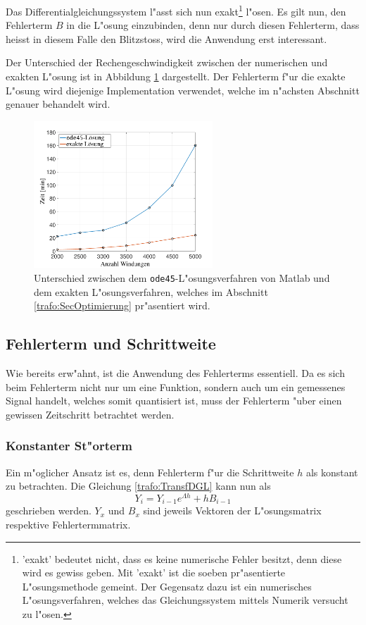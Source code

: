 \begin{refsection}
Das Differentialgleichungssystem l"asst sich nun exakt\footnote{'exakt' bedeutet nicht, dass es keine numerische Fehler besitzt, denn diese wird es gewiss geben. Mit 'exakt' ist die soeben pr"asentierte L"osungsmethode gemeint. Der Gegensatz dazu ist ein numerisches L"osungsverfahren, welches das Gleichungssystem mittels Numerik versucht zu l"osen.} l"osen. Es gilt nun, den Fehlerterm $B$ in die L"osung einzubinden, denn nur durch diesen Fehlerterm, dass heisst in diesem Falle den Blitzstoss, wird die Anwendung erst interessant.

Der Unterschied der Rechengeschwindigkeit zwischen der numerischen und exakten L"osung ist in Abbildung \ref{trafo:ode45vsExact} dargestellt. Der Fehlerterm f"ur die exakte L"osung wird diejenige Implementation verwendet, welche im n"achsten Abschnitt genauer behandelt wird. 

	\begin{figure}
		\centering
		\includegraphics[width=0.6\textwidth]{./Trafo/images/ode45vsExact.pdf}
		\caption{Unterschied zwischen dem \texttt{ode45}-L"osungsverfahren von Matlab und dem exakten L"osungsverfahren, welches im Abschnitt \ref{trafo:SecOptimierung} pr"asentiert wird.}
		\label{trafo:ode45vsExact}
	\end{figure}


\subsection{Fehlerterm und Schrittweite}
Wie bereits erw"ahnt, ist die Anwendung des Fehlerterms essentiell. Da es sich beim Fehlerterm nicht nur um eine Funktion, sondern auch um ein gemessenes Signal handelt, welches somit quantisiert ist, muss der Fehlerterm "uber einen gewissen Zeitschritt betrachtet werden.

\subsubsection{Konstanter St"orterm}
Ein m"oglicher Ansatz ist es, denn Fehlerterm f"ur die Schrittweite $h$ als konstant zu betrachten. Die Gleichung \ref{trafo:TransfDGL} kann nun als
\begin{equation*}
	Y_i = Y_{i-1} e^{\Lambda h}  + h B_{i-1}
\end{equation*}
geschrieben werden. $Y_x$ und $B_x$ sind jeweils Vektoren der L"osungsmatrix respektive Fehlertermmatrix. 


\end{refsection}
